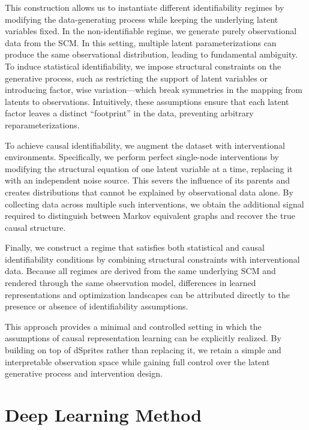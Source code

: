 \documentclass{article} %
\begin{document}
This construction allows us to instantiate different identifiability regimes by modifying the data-generating process while keeping the underlying latent variables fixed. In the non-identifiable regime, we generate purely observational data from the SCM. In this setting, multiple latent parameterizations can produce the same observational distribution, leading to fundamental ambiguity. To induce statistical identifiability, we impose structural constraints on the generative process, such as restricting the support of latent variables or introducing factor, wise variation—which break symmetries in the mapping from latents to observations. Intuitively, these assumptions ensure that each latent factor leaves a distinct “footprint” in the data, preventing arbitrary reparameterizations.

To achieve causal identifiability, we augment the dataset with interventional environments. Specifically, we perform perfect single-node interventions by modifying the structural equation of one latent variable at a time, replacing it with an independent noise source. This severs the influence of its parents and creates distributions that cannot be explained by observational data alone. By collecting data across multiple such interventions, we obtain the additional signal required to distinguish between Markov equivalent graphs and recover the true causal structure.

Finally, we construct a regime that satisfies both statistical and causal identifiability conditions by combining structural constraints with interventional data. Because all regimes are derived from the same underlying SCM and rendered through the same observation model, differences in learned representations and optimization landscapes can be attributed directly to the presence or absence of identifiability assumptions.

This approach provides a minimal and controlled setting in which the assumptions of causal representation learning can be explicitly realized. By building on top of dSprites rather than replacing it, we retain a simple and interpretable observation space while gaining full control over the latent generative process and intervention design.

\section{Deep Learning Method}
\end{document}
